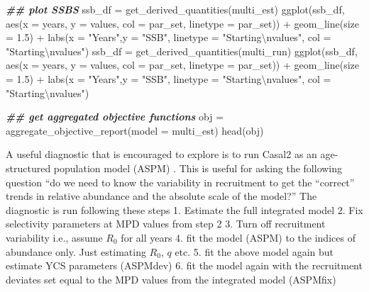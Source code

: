 \documentclass[
]{book}
\newenvironment{Shaded}{\begin{snugshade}}{\end{snugshade}}
\newcommand{\AttributeTok}[1]{\textcolor[rgb]{0.77,0.63,0.00}{#1}}
\newcommand{\DocumentationTok}[1]{\textcolor[rgb]{0.56,0.35,0.01}{\textbf{\textit{#1}}}}
\newcommand{\FloatTok}[1]{\textcolor[rgb]{0.00,0.00,0.81}{#1}}
\newcommand{\FunctionTok}[1]{\textcolor[rgb]{0.00,0.00,0.00}{#1}}
\newcommand{\NormalTok}[1]{#1}
\newcommand{\OtherTok}[1]{\textcolor[rgb]{0.56,0.35,0.01}{#1}}
\newcommand{\SpecialCharTok}[1]{\textcolor[rgb]{0.00,0.00,0.00}{#1}}
\newcommand{\StringTok}[1]{\textcolor[rgb]{0.31,0.60,0.02}{#1}}
\begin{document}
\begin{Shaded}
\begin{Highlighting}[]
\DocumentationTok{\#\# plot SSBS}
\NormalTok{ssb\_df }\OtherTok{=} \FunctionTok{get\_derived\_quantities}\NormalTok{(multi\_est)}
\FunctionTok{ggplot}\NormalTok{(ssb\_df, }\FunctionTok{aes}\NormalTok{(}\AttributeTok{x =}\NormalTok{ years, }\AttributeTok{y =}\NormalTok{ values, }\AttributeTok{col =}\NormalTok{ par\_set, }\AttributeTok{linetype =}\NormalTok{ par\_set)) }\SpecialCharTok{+}
  \FunctionTok{geom\_line}\NormalTok{(}\AttributeTok{size =} \FloatTok{1.5}\NormalTok{) }\SpecialCharTok{+}
  \FunctionTok{labs}\NormalTok{(}\AttributeTok{x =} \StringTok{"Years"}\NormalTok{,}\AttributeTok{y =} \StringTok{"SSB"}\NormalTok{, }\AttributeTok{linetype =} \StringTok{"Starting}\SpecialCharTok{\textbackslash{}n}\StringTok{values"}\NormalTok{, }\AttributeTok{col =} \StringTok{"Starting}\SpecialCharTok{\textbackslash{}n}\StringTok{values"}\NormalTok{)}
\NormalTok{ssb\_df }\OtherTok{=} \FunctionTok{get\_derived\_quantities}\NormalTok{(multi\_run)}
\FunctionTok{ggplot}\NormalTok{(ssb\_df, }\FunctionTok{aes}\NormalTok{(}\AttributeTok{x =}\NormalTok{ years, }\AttributeTok{y =}\NormalTok{ values, }\AttributeTok{col =}\NormalTok{ par\_set, }\AttributeTok{linetype =}\NormalTok{ par\_set)) }\SpecialCharTok{+}
  \FunctionTok{geom\_line}\NormalTok{(}\AttributeTok{size =} \FloatTok{1.5}\NormalTok{) }\SpecialCharTok{+}
  \FunctionTok{labs}\NormalTok{(}\AttributeTok{x =} \StringTok{"Years"}\NormalTok{,}\AttributeTok{y =} \StringTok{"SSB"}\NormalTok{, }\AttributeTok{linetype =} \StringTok{"Starting}\SpecialCharTok{\textbackslash{}n}\StringTok{values"}\NormalTok{, }\AttributeTok{col =} \StringTok{"Starting}\SpecialCharTok{\textbackslash{}n}\StringTok{values"}\NormalTok{)}

\DocumentationTok{\#\# get aggregated objective functions}
\NormalTok{obj }\OtherTok{=} \FunctionTok{aggregate\_objective\_report}\NormalTok{(}\AttributeTok{model =}\NormalTok{ multi\_est)}
\FunctionTok{head}\NormalTok{(obj)}
\end{Highlighting}
\end{Shaded}

A useful diagnostic that is encouraged to explore is to run Casal2 as an age-structured population model (ASPM) \citep{MINTEVERA2017114, CARVALHO2021105959}. This is useful for asking the following question ``do we need to know the variability in recruitment to get the ``correct'' trends in relative abundance and the absolute scale of the model?'' The diagnostic is run following these steps
1. Estimate the full integrated model
2. Fix selectivity parameters at MPD values from step 2
3. Turn off recruitment variability i.e., assume \(R_0\) for all years
4. fit the model (ASPM) to the indices of abundance only. Just estimating \(R_0\), \(q\) etc.
5. fit the above model again but estimate YCS parameters (ASPMdev)
6. fit the model again with the recruitment deviates set equal to the MPD values from the integrated model (ASPMfix)
\end{document}
